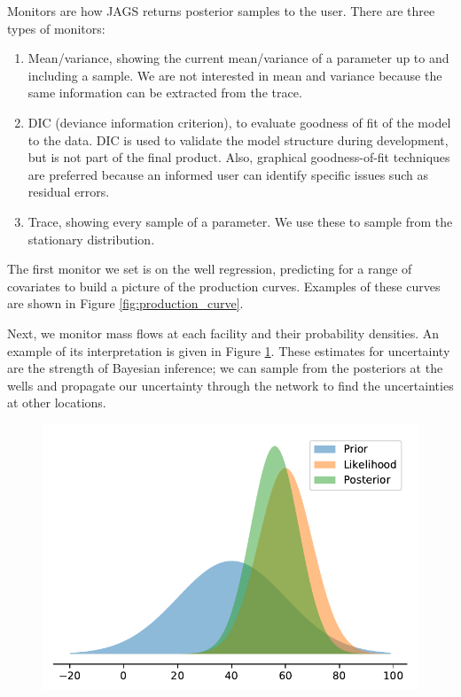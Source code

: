 \documentclass[a4paper, 12pt]{article}
\begin{document}
Monitors are how JAGS returns posterior samples to the user. There are three types of monitors:

\begin{enumerate}
\item Mean/variance, showing the current mean/variance of a parameter up to and including a sample. We are not interested in mean and variance because the same information can be extracted from the trace.
\item DIC (deviance information criterion), to evaluate goodness of fit of the model to the data. DIC is used to validate the model structure during development, but is not part of the final product. Also, graphical goodness-of-fit techniques are preferred because an informed user can identify specific issues such as residual errors.
\item Trace, showing every sample of a parameter. We use these to sample from the stationary distribution.
\end{enumerate}

The first monitor we set is on the well regression, predicting for a range of covariates to build a picture of the production curves. Examples of these curves are shown in Figure \ref{fig:production_curve}.

Next, we monitor mass flows at each facility and their probability densities. An example of its interpretation is given in Figure \ref{fig:bayesdemo}. These estimates for uncertainty are the strength of Bayesian inference; we can sample from the posteriors at the wells and propagate our uncertainty through the network to find the uncertainties at other locations.

\begin{figure}
\centering
  \includegraphics[width=0.5\linewidth]{media/bayesdemo}
  \label{fig:bayesdemo}
\end{figure}
\end{document}
